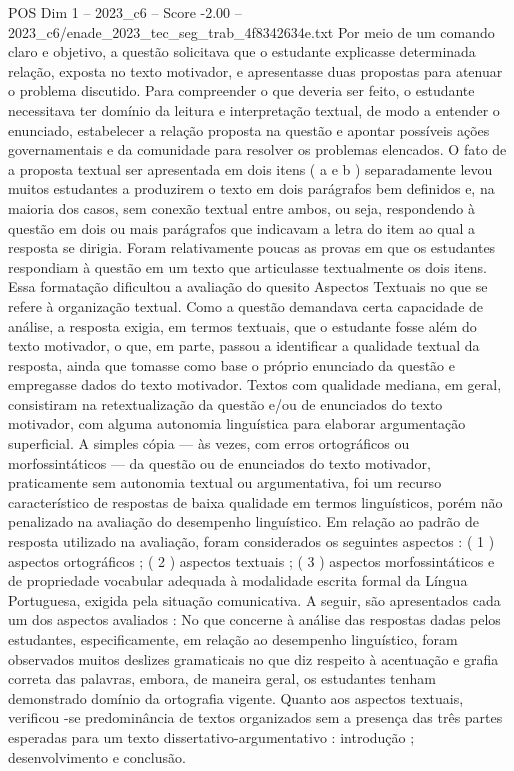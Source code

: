 \begin{textsample}{POS Dim 1 – 2023\_c6 – Score -2.00 – 2023\_c6/enade\_2023\_tec\_seg\_trab\_4f8342634e.txt}
Por meio de um comando claro e objetivo, a questão solicitava que o estudante explicasse determinada relação, exposta no texto motivador, e apresentasse duas propostas para atenuar o problema discutido.
Para compreender o que deveria ser feito, o estudante necessitava ter domínio da leitura e interpretação textual, de modo a entender o enunciado, estabelecer a relação proposta na questão e apontar possíveis ações governamentais e da comunidade para resolver os problemas elencados.
O fato de a proposta textual ser apresentada em dois itens ( a e b ) separadamente levou muitos estudantes a produzirem o texto em dois parágrafos bem definidos e, na maioria dos casos, sem conexão textual entre ambos, ou seja, respondendo à questão em dois ou mais parágrafos que indicavam a letra do item ao qual a resposta se dirigia.
Foram relativamente poucas as provas em que os estudantes respondiam à questão em um texto que articulasse textualmente os dois itens.
Essa formatação dificultou a avaliação do quesito Aspectos Textuais no que se refere à organização textual.
Como a questão demandava certa capacidade de análise, a resposta exigia, em termos textuais, que o estudante fosse além do texto motivador, o que, em parte, passou a identificar a qualidade textual da resposta, ainda que tomasse como base o próprio enunciado da questão e empregasse dados do texto motivador.
Textos com qualidade mediana, em geral, consistiram na retextualização da questão e/ou de enunciados do texto motivador, com alguma autonomia linguística para elaborar argumentação superficial.
A simples cópia — às vezes, com erros ortográficos ou morfossintáticos — da questão ou de enunciados do texto motivador, praticamente sem autonomia textual ou argumentativa, foi um recurso característico de respostas de baixa qualidade em termos linguísticos, porém não penalizado na avaliação do desempenho linguístico.
Em relação ao padrão de resposta utilizado na avaliação, foram considerados os seguintes aspectos : ( 1 ) aspectos ortográficos ; ( 2 ) aspectos textuais ; ( 3 ) aspectos morfossintáticos e de propriedade vocabular adequada à modalidade escrita formal da Língua Portuguesa, exigida pela situação comunicativa.
A seguir, são apresentados cada um dos aspectos avaliados : No que concerne à análise das respostas dadas pelos estudantes, especificamente, em relação ao desempenho linguístico, foram observados muitos deslizes gramaticais no que diz respeito à acentuação e grafia correta das palavras, embora, de maneira geral, os estudantes tenham demonstrado domínio da ortografia vigente.
Quanto aos aspectos textuais, verificou -se predominância de textos organizados sem a presença das três partes esperadas para um texto dissertativo-argumentativo : introdução ; desenvolvimento e conclusão.

\end{textsample}
